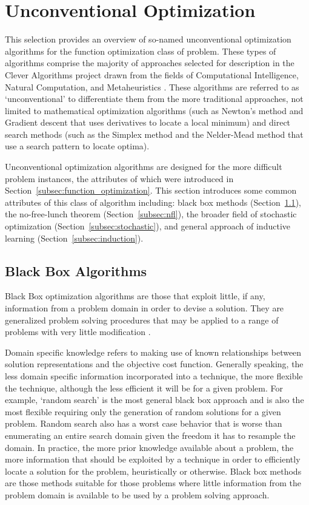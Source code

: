 \documentclass[a4paper, 11pt]{article}
\begin{document}
% 
% 
\section{Unconventional Optimization}
\label{sec:unconventional_optimization}
This selection provides an overview of so-named unconventional optimization algorithms for the function optimization class of problem. These types of algorithms comprise the majority of approaches selected for description in the Clever Algorithms project drawn from the fields of Computational Intelligence, Natural Computation, and Metaheuristics \cite{Brownlee2010b}. 
These algorithms are referred to as `unconventional' to differentiate them from the more traditional approaches, not limited to mathematical optimization algorithms (such as Newton's method and Gradient descent that uses derivatives to locate a local minimum) and direct search methods (such as the Simplex method and the Nelder-Mead method that use a search pattern to locate optima).

Unconventional optimization algorithms are designed for the more difficult problem instances, the attributes of which were introduced in Section~\ref{subsec:function_optimization}. This section introduces some common attributes of this class of algorithm including: black box methods (Section~\ref{subsec:black_box}), the no-free-lunch theorem (Section~\ref{subsec:nfl}), the broader field of stochastic optimization (Section~\ref{subsec:stochastic}), and general approach of inductive learning (Section~\ref{subsec:induction}).

% 
% 
\subsection{Black Box Algorithms}
\label{subsec:black_box}
Black Box optimization algorithms are those that exploit little, if any, information from a problem domain in order to devise a solution. They are generalized problem solving procedures that may be applied to a range of problems with very little modification \cite{Droste2006}.

Domain specific knowledge refers to making use of known relationships between solution representations and the objective cost function. Generally speaking, the less domain specific information incorporated into a technique, the more flexible the technique, although the less efficient it will be for a given problem. For example, `random search' is the most general black box approach and is also the most flexible requiring only the generation of random solutions for a given problem. Random search also has a worst case behavior that is worse than enumerating an entire search domain given the freedom it has to resample the domain. In practice, the more prior knowledge available about a problem, the more information that should be exploited by a technique in order to efficiently locate a solution for the problem, heuristically or otherwise. Black box methods are those methods suitable for those problems where little information from the problem domain is available to be used by a problem solving approach.  
\end{document}
